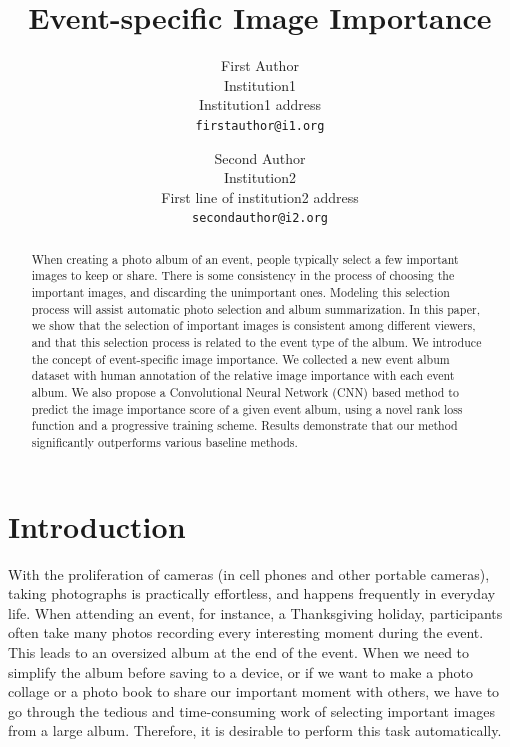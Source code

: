 \documentclass[10pt,twocolumn,letterpaper]{article}
\begin{document}
\title{Event-specific Image Importance}



\author{First Author\\
Institution1\\
Institution1 address\\
{\tt\small firstauthor@i1.org}
\and
Second Author\\
Institution2\\
First line of institution2 address\\
{\tt\small secondauthor@i2.org}
}

\maketitle

\begin{abstract}
When creating a photo album of an event, people typically select a few important images to keep or share. There is some consistency in the process of choosing the important images, and discarding the unimportant ones. Modeling this selection process will assist automatic photo selection and album summarization. In this paper, we show that the selection of important images is consistent among different viewers, and that this selection process is related to the event type of the album. We introduce the concept of event-specific image importance. We collected a new event album dataset with human annotation of the relative image importance with each event album. We also propose a Convolutional Neural Network (CNN) based method to predict the image importance score of a given event album, using a novel rank loss function and a progressive training scheme. Results demonstrate that our method significantly outperforms various baseline methods.

 
\end{abstract}

\section{Introduction}
With the proliferation of cameras (in cell phones and other portable cameras), taking photographs is practically effortless, and happens frequently in everyday life. When attending an event, for instance, a Thanksgiving holiday, participants often take many photos recording every interesting moment during the event. This leads to an oversized album at the end of the event. When we need to simplify the album before saving to a device, or if we want to make a photo collage or a photo book to share our important moment %
with others, we have to go through the tedious and time-consuming work of selecting important images from a large album. Therefore, it is desirable to perform this task automatically.
\end{document}
